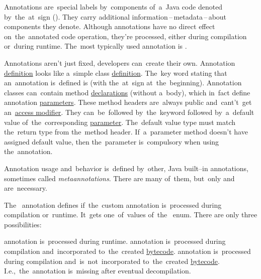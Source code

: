
\label{javaabstractclasses}

\label{javainterfaces}

\label{javaannotation}
Annotations are~special labels by~components of~a~Java code denoted by~the~at~sign ().
They carry additional information\,--\,metadata\,--\,about components they denote.
Although annotations have no direct effect on~the~annotated code operation, they're processed, either during compilation or~during runtime.
The~most typically used annotation is \hyperref[javaoverride]{}.

\label{javacustomannotations}
Annotations aren't just fixed, developers can~create their own.
Annotation \hyperref[declarationdefinition]{definition} looks like a~simple class \hyperref[declarationdefinition]{definition}.
The~key word stating that an~annotation is~defined is  (with the~at~sign at~the~beginning).
Annotation classes can~contain method \hyperref[declarationdefinition]{declarations} (without a~body), which in~fact define annotation \hyperref[parameterargument]{parameters}.
These method headers are~always public and~cant't~get an~\hyperref[javaaccessmodifiers]{access modifier}.
They can~be~followed by~the~keyword  followed by~a~default value of~the~corresponding \hyperref[parameterargument]{parameter}.
The~default value type must match the~return type from the~method header.
If~a~parameter method doesn't have assigned default value, then the~parameter is~compulsory when using the~annotation.

Annotation usage and~behavior is~defined by~other, Java built--in annotations, sometimes called \textit{metaannotations}.
There are many of~them, but~only  and~ are~necessary.

The~ annotation defines if~the~custom annotation is~processed during compilation or~runtime.
It~gets one~of~values of~the~ enum.
There are only three possibilities:
\begin{itemize}
     annotation is~processed during runtime.
     annotation is~processed during compilation and~incorporated to~the~created \hyperref[bytecode]{bytecode}.
     annotation is~processed during compilation and~is~not~incorporated to~the~created \hyperref[bytecode]{bytecode}.
             I.e.,~the~annotation is~missing after eventual decompilation.
\end{itemize}

